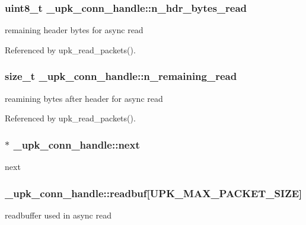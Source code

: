 \subsubsection[{n\_\-hdr\_\-bytes\_\-read}]{\setlength{\rightskip}{0pt plus 5cm}uint8\_\-t {\bf \_\-upk\_\-conn\_\-handle::n\_\-hdr\_\-bytes\_\-read}}\label{struct__upk__conn__handle_a9d01770138bb94d0e060929a635cd71d}
remaining header bytes for async read 

Referenced by upk\_\-read\_\-packets().

\subsubsection[{n\_\-remaining\_\-read}]{\setlength{\rightskip}{0pt plus 5cm}size\_\-t {\bf \_\-upk\_\-conn\_\-handle::n\_\-remaining\_\-read}}\label{struct__upk__conn__handle_a2fc49e5a769b39f8522a33a738d8bfff}
reamining bytes after header for async read 

Referenced by upk\_\-read\_\-packets().

\subsubsection[{next}]{$\ast$ {\bf \_\-upk\_\-conn\_\-handle::next}}\label{struct__upk__conn__handle_aedb759ce4d08a0d8b20b58a2ed70ac09}
next 
\subsubsection[{readbuf}]{ {\bf \_\-upk\_\-conn\_\-handle::readbuf}[UPK\_\-MAX\_\-PACKET\_\-SIZE]}\label{struct__upk__conn__handle_a1fdb2e874d3857b8966aa7dc6db0361f}
readbuffer used in async read 

